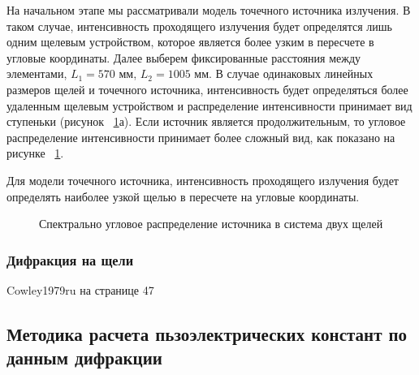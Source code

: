 На начальном этапе мы рассматривали модель точечного источника излучения.
В таком случае, интенсивность проходящего излучения будет определятся лишь
одним щелевым устройством, которое является более узким в пересчете в угловые
координаты. Далее выберем фиксированные расстояния между элементами,
$L_1 = 570$ мм, $L_2 = 1005$ мм. В случае одинаковых линейных размеров щелей и точечного
источника, интенсивность будет определяться более удаленным щелевым устройством и
распределение интенсивности принимает вид ступеньки (рисунок ~\ref{ris:sourc_map}а). Если источник является
 продолжительным, то угловое распределение интенсивности принимает более сложный вид, как показано на рисунке ~\ref{ris:sourc_map}.

 Для модели точечного источника, интенсивность проходящего излучения будет определять наиболее
 узкой щелью в пересчете на угловые координаты.

 \begin{figure}[H]
   \centering
   \hfill
   \caption{Спектрально угловое распределение источника в система двух щелей}
   \label{ris:sourc_map}
 \end{figure}

   \subsubsection{Дифракция на щели}
      Cowley1979ru на странице 47
  

\subsection{Методика расчета пьзоэлектрических констант по данным дифракции}
